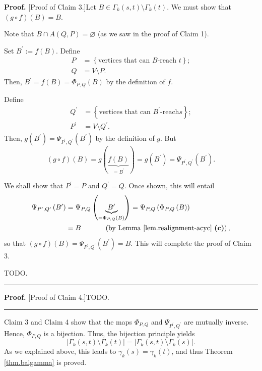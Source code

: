 \documentclass[numbers=enddot,12pt,final,onecolumn,notitlepage]{scrartcl}%
\theoremstyle{definition}
\newenvironment{proof}[1][Proof]{\noindent\textbf{#1.} }{\ \rule{0.5em}{0.5em}}
\theoremstyle{plainsl}
\begin{document}
\begin{proof}
[Proof of Claim 3.]Let $B\in\Gamma_{k}\left(  s,t\right)  \setminus\Gamma
_{k}\left(  t\right)  $. We must show that $\left(  g\circ f\right)  \left(
B\right)  =B$.

Note that $B\cap A\left(  Q,P\right)  =\varnothing$ (as we saw in the proof of
Claim 1).

Set $B^{\prime}:=f\left(  B\right)  $. Define
\begin{align*}
P &  =\left\{  \text{vertices that can }B\text{-reach }t\right\}  ;\\
Q &  =V\setminus P.
\end{align*}
Then, $B^{\prime}=f\left(  B\right)  =\Phi_{P,Q}\left(  B\right)  $ by the
definition of $f$.

Define
\begin{align*}
Q^{\prime} &  =\left\{  \text{vertices that can }B^{\prime}\text{-reach
}s\right\}  ;\\
P^{\prime} &  =V\setminus Q^{\prime}.
\end{align*}
Then, $g\left(  B^{\prime}\right)  =\Psi_{P^{\prime},Q^{\prime}}\left(
B^{\prime}\right)  $ by the definition of $g$. But
\[
\left(  g\circ f\right)  \left(  B\right)  =g\left(  \underbrace{f\left(
B\right)  }_{=B^{\prime}}\right)  =g\left(  B^{\prime}\right)  =\Psi
_{P^{\prime},Q^{\prime}}\left(  B^{\prime}\right)  .
\]


We shall show that $P^{\prime}=P$ and $Q^{\prime}=Q$. Once shown, this will
entail
\begin{align*}
\Psi_{P^{\prime},Q^{\prime}}\left(  B^{\prime}\right)    & =\Psi_{P,Q}\left(
\underbrace{B^{\prime}}_{=\Phi_{P,Q}\left(  B\right)  }\right)  =\Psi
_{P,Q}\left(  \Phi_{P,Q}\left(  B\right)  \right)  \\
& =B\ \ \ \ \ \ \ \ \ \ \left(  \text{by Lemma \ref{lem.realignment-acyc}
\textbf{(c)}}\right)  ,
\end{align*}
so that $\left(  g\circ f\right)  \left(  B\right)  =\Psi_{P^{\prime
},Q^{\prime}}\left(  B^{\prime}\right)  =B$. This will complete the proof of
Claim 3.

TODO. 
\end{proof}

\begin{proof}
[Proof of Claim 4.]TODO.
\end{proof}

Claim 3 and Claim 4 show that the maps $\Phi_{P,Q}$ and $\Psi_{P^{\prime
},Q^{\prime}}$ are mutually inverse. Hence, $\Phi_{P,Q}$ is a bijection. Thus,
the bijection principle yields%
\[
\left\vert \Gamma_{k}\left(  s,t\right)  \setminus\Gamma_{k}\left(  t\right)
\right\vert =\left\vert \Gamma_{k}\left(  s,t\right)  \setminus\Gamma
_{k}\left(  s\right)  \right\vert .
\]
As we explained above, this leads to $\gamma_{k}\left(  s\right)  =\gamma
_{k}\left(  t\right)  $, and thus Theorem \ref{thm.balgamma} is proved.
\end{document}
